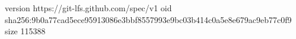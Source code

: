 version https://git-lfs.github.com/spec/v1
oid sha256:9b0a77cad5ece95913086e3bbf8557993e9bc03b414c0a5e8e679ac9eb77c0f9
size 115388
